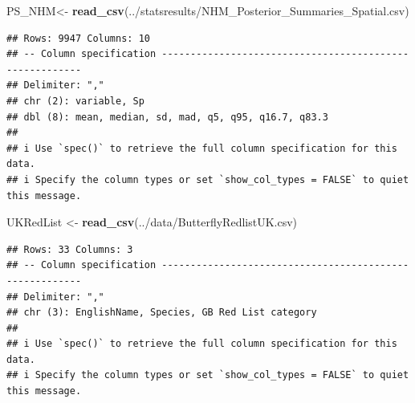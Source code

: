 \documentclass[
]{article}
\newenvironment{Shaded}{\begin{snugshade}}{\end{snugshade}}
\newcommand{\FunctionTok}[1]{\textcolor[rgb]{0.13,0.29,0.53}{\textbf{#1}}}
\newcommand{\NormalTok}[1]{#1}
\newcommand{\OtherTok}[1]{\textcolor[rgb]{0.56,0.35,0.01}{#1}}
\newcommand{\StringTok}[1]{\textcolor[rgb]{0.31,0.60,0.02}{#1}}
\begin{document}
\begin{Shaded}
\begin{Highlighting}[]
\NormalTok{PS\_NHM}\OtherTok{\textless{}{-}} \FunctionTok{read\_csv}\NormalTok{(}\StringTok{\textquotesingle{}../statsresults/NHM\_Posterior\_Summaries\_Spatial.csv\textquotesingle{}}\NormalTok{)}
\end{Highlighting}
\end{Shaded}

\begin{verbatim}
## Rows: 9947 Columns: 10
## -- Column specification --------------------------------------------------------
## Delimiter: ","
## chr (2): variable, Sp
## dbl (8): mean, median, sd, mad, q5, q95, q16.7, q83.3
## 
## i Use `spec()` to retrieve the full column specification for this data.
## i Specify the column types or set `show_col_types = FALSE` to quiet this message.
\end{verbatim}

\begin{Shaded}
\begin{Highlighting}[]
\NormalTok{UKRedList }\OtherTok{\textless{}{-}} \FunctionTok{read\_csv}\NormalTok{(}\StringTok{\textquotesingle{}../data/ButterflyRedlistUK.csv\textquotesingle{}}\NormalTok{)}
\end{Highlighting}
\end{Shaded}

\begin{verbatim}
## Rows: 33 Columns: 3
## -- Column specification --------------------------------------------------------
## Delimiter: ","
## chr (3): EnglishName, Species, GB Red List category
## 
## i Use `spec()` to retrieve the full column specification for this data.
## i Specify the column types or set `show_col_types = FALSE` to quiet this message.
\end{verbatim}
\end{document}
